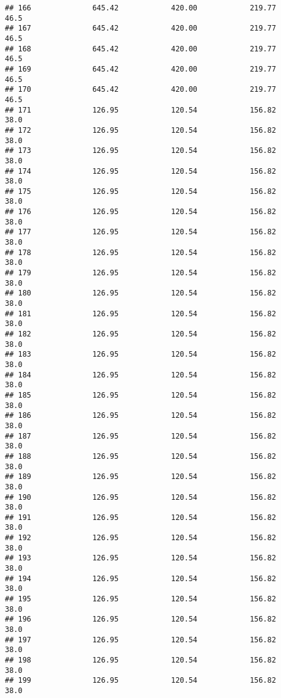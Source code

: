 \documentclass[]{article}
\begin{document}
\begin{verbatim}
## 166              645.42            420.00            219.77           46.5
## 167              645.42            420.00            219.77           46.5
## 168              645.42            420.00            219.77           46.5
## 169              645.42            420.00            219.77           46.5
## 170              645.42            420.00            219.77           46.5
## 171              126.95            120.54            156.82           38.0
## 172              126.95            120.54            156.82           38.0
## 173              126.95            120.54            156.82           38.0
## 174              126.95            120.54            156.82           38.0
## 175              126.95            120.54            156.82           38.0
## 176              126.95            120.54            156.82           38.0
## 177              126.95            120.54            156.82           38.0
## 178              126.95            120.54            156.82           38.0
## 179              126.95            120.54            156.82           38.0
## 180              126.95            120.54            156.82           38.0
## 181              126.95            120.54            156.82           38.0
## 182              126.95            120.54            156.82           38.0
## 183              126.95            120.54            156.82           38.0
## 184              126.95            120.54            156.82           38.0
## 185              126.95            120.54            156.82           38.0
## 186              126.95            120.54            156.82           38.0
## 187              126.95            120.54            156.82           38.0
## 188              126.95            120.54            156.82           38.0
## 189              126.95            120.54            156.82           38.0
## 190              126.95            120.54            156.82           38.0
## 191              126.95            120.54            156.82           38.0
## 192              126.95            120.54            156.82           38.0
## 193              126.95            120.54            156.82           38.0
## 194              126.95            120.54            156.82           38.0
## 195              126.95            120.54            156.82           38.0
## 196              126.95            120.54            156.82           38.0
## 197              126.95            120.54            156.82           38.0
## 198              126.95            120.54            156.82           38.0
## 199              126.95            120.54            156.82           38.0

\end{verbatim}
\end{document}
